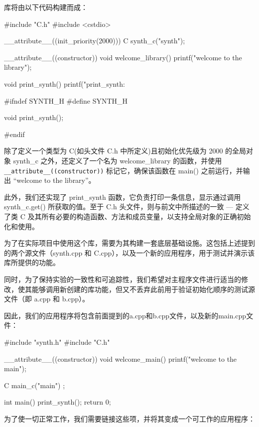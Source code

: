 库将由以下代码构建而成：


\begin{cpp}
#include "C.h"
#include <cstdio>

__attribute__((init_priority(2000))) C synth_c("synth");

__attribute__((constructor)) void welcome_library() {
  printf("welcome to the library\n");
}

void print_synth() {
  printf("print_synth: %
}
\end{cpp}


\begin{cpp}
#ifndef SYNTH_H
#define SYNTH_H

void print_synth();

#endif
\end{cpp}

除了定义一个类型为 C(如头文件 C.h 中所定义)且初始化优先级为 2000 的全局对象 synth\_c 之外，还定义了一个名为 welcome\_library 的函数，并使用 \verb|__attribute__((constructor))| 标记它，确保该函数在 main() 之前运行，并输出 “welcome to the library”。

此外，我们还实现了 print\_synth 函数，它负责打印一条信息，显示通过调用 synth\_c.get() 所获取的值。至于 C.h 头文件，则与前文中所描述的一致 --- 定义了类 C 及其所有必要的构造函数、方法和成员变量，以支持全局对象的正确初始化和使用。

为了在实际项目中使用这个库，需要为其构建一套底层基础设施。这包括上述提到的两个源文件（synth.cpp 和 C.cpp），以及一个新的应用程序，用于测试并演示该库所提供的功能。

同时，为了保持实验的一致性和可追踪性，我们希望对主程序文件进行适当的修改，使其能够调用新创建的库功能，但又不丢弃此前用于验证初始化顺序的测试源文件（即 a.cpp 和 b.cpp）。

因此，我们的应用程序将包含前面提到的a.cpp和b.cpp文件，以及新的main.cpp文件：


\begin{cpp}
#include "synth.h"
#include "C.h"

__attribute__((constructor)) void welcome_main() {
  printf("welcome to the main\n");
}

C main_c("main") ;

int main() {
  print_synth();
  return 0;
}
\end{cpp}

为了使一切正常工作，我们需要链接这些项，并将其变成一个可工作的应用程序：

